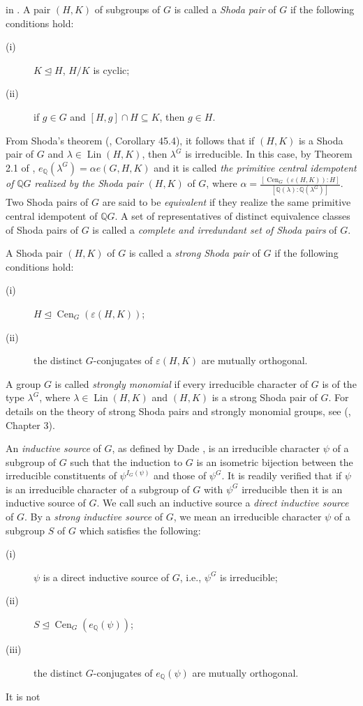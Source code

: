 \documentclass[12pt,a4paper]{article}
\begin{document}
in \cite{OdRS04}. A pair $(H,K)$ of subgroups of $G$ is called a \textit{Shoda pair} of $G$ if the following conditions hold:\begin{description}\item[(i)] $K\unlhd H$, $H/K$ is cyclic;\item[(ii)] if $g \in G$ and $[H,g]\cap H\subseteq K$, then $g \in H$.\end{description}\indent From Shoda's theorem (\cite{CR}, Corollary 45.4), it follows that if $(H,K)$ is a Shoda pair of $G$ and $\lambda \in \operatorname{Lin}(H,K)$, then $\lambda^{G}$ is irreducible. In this case, by Theorem 2.1 of \cite{OdRS04}, $e_{\mathbb{Q}}(\lambda^{G})=\alpha e(G,H,K)$ and it is called \textit{the primitive central idempotent of }$\mathbb{Q}G$ \textit{realized by the Shoda pair }$(H,K)$ of $G$, where $\alpha=\frac{[\operatorname{Cen}_{G}(\varepsilon(H,K)):H]}{[\mathbb{Q}(\lambda):\mathbb{Q}(\lambda^{G})]}$. Two Shoda pairs of $G$ are said to be \textit{equivalent} if they realize the same primitive central idempotent of $\mathbb{Q}G$. A set of representatives of distinct equivalence classes of Shoda pairs of $G$ is called a \textit{complete and irredundant set of Shoda pairs} of $G$. \par A Shoda pair $(H,K)$ of $G$ is called a \textit{strong Shoda pair} of $G$ if the following conditions hold:\begin{description}\item [(i)]$H \unlhd \operatorname{Cen}_{G}(\varepsilon(H,K))$;\item [(ii)] the distinct $G$-conjugates of $\varepsilon(H,K)$ are mutually orthogonal.\end{description}\par A group $G$ is called \textit{strongly monomial} if every irreducible character of $G$ is of the type $\lambda^{G}$, where $\lambda \in \operatorname{Lin}(H,K)$ and $(H,K)$ is a strong Shoda pair of $G$. For details on the theory of strong Shoda pairs and strongly monomial groups, see (\cite{JdR}, Chapter 3).\par An \textit{inductive source} of $G$, as defined by Dade \cite{D}, is an irreducible character $\psi$ of a subgroup of $G$ such that the induction to $G$ is an isometric bijection between the irreducible constituents of $\psi^{I_{G}(\psi)}$ and those of $\psi^{G}$. It is readily verified that if $\psi$ is an irreducible character of a subgroup of $G$ with $\psi^{G}$ irreducible then it is an inductive source of $G$. We call such an inductive source a \textit{direct inductive source} of $G$. By a \textit{strong inductive source} of $G$, we mean an irreducible character $\psi$ of a subgroup $S$ of $G$ which satisfies the following: \begin{description}\item [(i)] $\psi$ is a direct inductive source of $G$, i.e., $\psi^{G}$ is irreducible; \item [(ii)] $S \unlhd \operatorname{Cen}_{G}(e_{\mathbb{Q}}(\psi))$;\item [(iii)] the distinct $G$-conjugates of $e_{\mathbb{Q}}(\psi)$ are mutually orthogonal.\end{description}  It is not 
\end{document}
